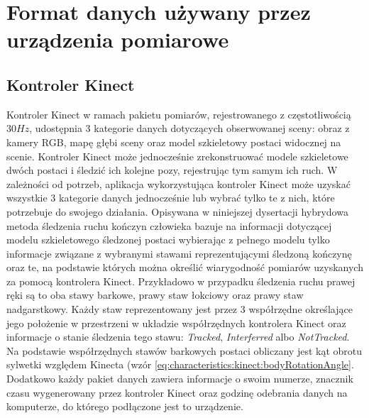 \section{Format danych używany przez urządzenia pomiarowe}
\subsection{Kontroler Kinect}
Kontroler Kinect w ramach pakietu pomiarów, rejestrowanego z częstotliwością $30 Hz$, udostępnia 3 kategorie danych dotyczących obserwowanej sceny: obraz z kamery RGB, mapę głębi sceny oraz model szkieletowy postaci widocznej na scenie. Kontroler Kinect może jednocześnie zrekonstruować modele szkieletowe dwóch postaci i śledzić ich kolejne pozy, rejestrując tym samym ich ruch. W zależności od potrzeb, aplikacja wykorzystująca kontroler Kinect może uzyskać wszystkie 3 kategorie danych jednocześnie lub wybrać tylko te z nich, które potrzebuje do swojego działania. Opisywana w niniejszej dysertacji hybrydowa metoda śledzenia ruchu kończyn człowieka bazuje na informacji dotyczącej modelu szkieletowego śledzonej postaci wybierając z pełnego modelu tylko informacje związane z wybranymi stawami reprezentującymi śledzoną kończynę oraz te, na podstawie których można określić wiarygodność pomiarów uzyskanych za pomocą kontrolera Kinect. 
Przykładowo w przypadku śledzenia ruchu prawej ręki są to oba stawy barkowe, prawy staw łokciowy oraz prawy staw nadgarstkowy. Każdy staw reprezentowany jest przez 3 współrzędne określające jego położenie w przestrzeni w układzie współrzędnych kontrolera Kinect
oraz informacje o stanie śledzenia tego stawu: \emph{Tracked}, \emph{Interferred} albo \emph{NotTracked}.
Na podstawie współrzędnych stawów barkowych postaci obliczany jest kąt obrotu sylwetki względem Kinecta (wzór \eqref{eq:characteristics:kinect:bodyRotationAngle}. Dodatkowo każdy pakiet danych zawiera informacje o swoim numerze, znacznik czasu wygenerowany przez kontroler Kinect oraz godzinę odebrania danych na komputerze, do którego podłączone jest to urządzenie.

